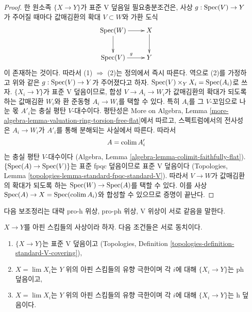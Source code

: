 \begin{proof}
한 원소족 $\{X \to Y\}$가 표준 V 덮음일 필요충분조건은,
사상 $g : \mathop{\mathrm{Spec}}(V) \to Y$가 주어질 때마다 값매김환의 확대
$V \subset W$와 가환 도식
$$
\xymatrix{
\Spec(W) \ar[r] \ar[d] & X \ar[d] \\
\Spec(V) \ar[r]^g & Y
}
$$
이 존재하는 것이다. 따라서 (1) $\Rightarrow$ (2)는 정의에서 즉시 따른다.
역으로 (2)를 가정하고 위와 같은 $g : \mathop{\mathrm{Spec}}(V) \to Y$가 주어졌다고 하자.
$\mathop{\mathrm{Spec}}(V) \times_Y X_i = \mathop{\mathrm{Spec}}(A_i)$로 쓰자.
$\{X_i \to Y\}$가 표준 V 덮음이므로, 합성
$V \to A_i \to W_i$가 값매김환의 확대가 되도록 하는 값매김환 $W_i$와
환 준동형 $A_i \to W_i$를 택할 수 있다. 특히 $A_i$를 그
$V$-꼬임으로 나눈 몫 $A'_i$는 충실 평탄 $V$-대수이다.
평탄성은 More on Algebra, Lemma
\ref{more-algebra-lemma-valuation-ring-torsion-free-flat}에서 따르고,
스펙트럼에서의 전사성은 $A_i \to W_i$가 $A'_i$를 통해 분해되는
사실에서 따른다. 따라서
$$
A = \mathop{\mathrm{colim}}\nolimits A'_i
$$
는 충실 평탄 $V$-대수이다
(Algebra, Lemma \ref{algebra-lemma-colimit-faithfully-flat}).
$\{\mathop{\mathrm{Spec}}(A) \to \mathop{\mathrm{Spec}}(V)\}$는 표준 fpqc 덮음이므로 표준 V 덮음이다
(Topologies, Lemma \ref{topologies-lemma-standard-fpqc-standard-V}).
따라서 $V \to W$가 값매김환의 확대가 되도록 하는
$\mathop{\mathrm{Spec}}(W) \to \mathop{\mathrm{Spec}}(A)$를 택할 수 있다. 이를 사상
$\mathop{\mathrm{Spec}}(A) \to X = \mathop{\mathrm{Spec}}(\mathop{\mathrm{colim}}\nolimits A_i)$와 합성할 수 있으므로
증명이 끝난다.
\end{proof}

\noindent
다음 보조정리는 대략 pro-h 위상, pro-ph 위상, V 위상이 서로 같음을 말한다.

\begin{lemma}
\label{lemma-pro-h-V}
$X \to Y$를 아핀 스킴들의 사상이라 하자. 다음 조건들은 서로 동치이다.
\begin{enumerate}
\item $\{X \to Y\}$는 표준 V 덮음이고
(Topologies, Definition \ref{topologies-definition-standard-V-covering}),
\item $X = \lim X_i$는 $Y$ 위의 아핀 스킴들의 유향 극한이며
각 $i$에 대해 $\{X_i \to Y\}$는 ph 덮음이고,
\item $X = \lim X_i$는 $Y$ 위의 아핀 스킴들의 유향 극한이며
각 $i$에 대해 $\{X_i \to Y\}$는 h 덮음이다.
\end{enumerate}
\end{lemma}

